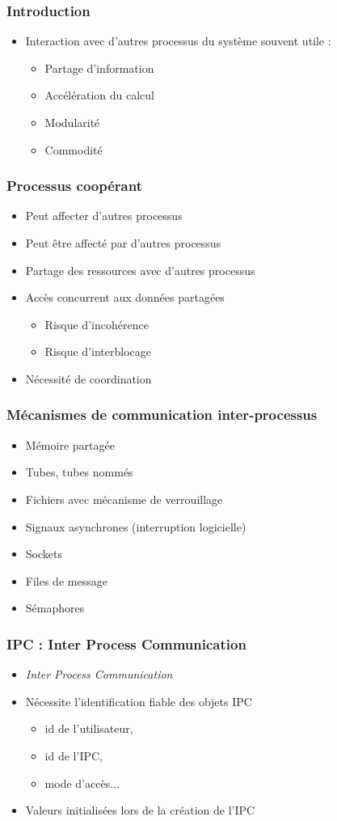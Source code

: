 \begin{frame}
\frametitle{Introduction}
\begin{itemize}
\item Interaction avec d’autres processus du système souvent utile :
\begin{itemize}
\item Partage d’information
\item Accélération du calcul
\item Modularité
\item Commodité
\end{itemize}
\end{itemize}
\end{frame}

\begin{frame}
\frametitle{Processus coopérant}
\begin{itemize}
\item Peut affecter d’autres processus
\item Peut être affecté par d’autres processus
\item Partage des ressources avec d’autres processus
\item Accès concurrent aux données partagées
\begin{itemize}
\item Risque d’incohérence
\item Risque d’interblocage
\end{itemize}
\item Nécessité de coordination
\end{itemize}
\end{frame}

\begin{frame}
\frametitle{Mécanismes de communication inter-processus}
\begin{itemize}
\item Mémoire partagée
\item Tubes, tubes nommés
\item Fichiers avec mécanisme de verrouillage
\item Signaux asynchrones (interruption logicielle)
\item Sockets
\item Files de message
\item Sémaphores
\end{itemize}
\end{frame}

\begin{frame}
\frametitle{IPC : Inter Process Communication}
\begin{itemize}
\item \textit{Inter Process Communication}
\item Nécessite l’identification fiable des objets IPC
\begin{itemize}
\item id de l’utilisateur,
\item id de l’IPC,
\item mode d’accès...
\end{itemize}
\item Valeurs initialisées lors de la création de l’IPC
\end{itemize}
\end{frame}


